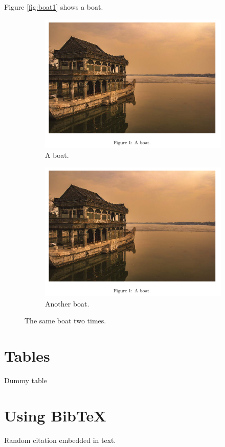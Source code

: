 \documentclass{article}
\begin{document}
    Figure \ref{fig:boat1} shows a boat.

    \begin{figure}[h!]
	\centering
	\begin{subfigure}[b]{0.4\linewidth}
		\includegraphics[width=\linewidth]{images/boat.png}
		\caption{A boat.}
	\end{subfigure}
	\begin{subfigure}[b]{0.4\linewidth}
		\includegraphics[width=\linewidth]{images/boat.png}
		\caption{Another boat.}
	\end{subfigure}
	\caption{The same boat two times.}
	\label{fig:twoboats}
    \end{figure}

    \newpage

    \section{Tables}

    \begin{table}[h!]
	\caption{Dummy table}
    \end{table}

    \newpage

    \section{Using BibTeX}

    Random citation \autocite[1]{DUMMY:1} embedded in text.

    \newpage
    
    \begin{appendix}
	\listoffigures
	\listoftables
    \end{appendix}
\end{document}
